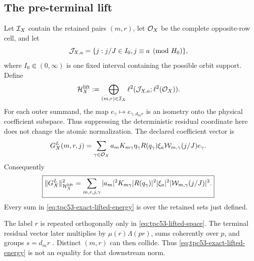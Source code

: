 \subsection{The pre-terminal lift}

Let \(\mathcal I_X\) contain the retained pairs \((m,r)\), let \(\mathcal O_X\) be the
complete opposite-row cell, and let
\[
 \mathcal J_{X,a}=\{j:j/J\in I_0, j\equiv a\pmod {H_0}\},
\]
where \(I_0\Subset(0,\infty)\) is one fixed interval containing the
possible orbit support.  Define
\begin{equation}
 \mathcal H_X^{\rm lift}
 :=\bigoplus_{(m,r)\in\mathcal I_X}
   \ell^2(\mathcal J_{X,a};\ell^2(\mathcal O_X)).
 \label{eq:tpc53-lifted-space}
\end{equation}
For each outer summand, the map
\(e_\gamma\mapsto e_{\gamma,d_mr}\) is an isometry onto the physical
coefficient subspace.  Thus suppressing the deterministic residual
coordinate here does not change the atomic normalization.
The declared coefficient vector is
\begin{equation}
 G_X^{L}(m,r,j)
 =\sum_{\gamma\in\mathcal O_X}
 a_mK_{m\gamma}\eta_\gamma R(q_\gamma)\xi_a
 \mathcal W_{m,\gamma}(j/J)e_{\gamma}.
 \label{eq:tpc53-literal-profile-vector}
\end{equation}
Consequently
\begin{equation}
 \boxed{
 \|G_X^L\|_{\mathcal H_X^{\rm lift}}^2
 =\sum_{m,r,j,\gamma}
 |a_m|^2K_{m\gamma}|R(q_\gamma)|^2|\xi_a|^2
 |\mathcal W_{m,\gamma}(j/J)|^2.}
 \label{eq:tpc53-exact-lifted-energy}
\end{equation}
Every sum in \eqref{eq:tpc53-exact-lifted-energy} is over the retained
sets just defined.

The label \(r\) is repeated orthogonally only in
\eqref{eq:tpc53-lifted-space}.  The terminal residual vector later
multiplies by \(\mu(r)\Lambda(pr)\), sums coherently over \(p\), and
groups \(s=d_mr\) \citep{WangTPC48}.  Distinct \((m,r)\) can then
collide.  Thus \eqref{eq:tpc53-exact-lifted-energy} is not an equality
for that downstream norm.

